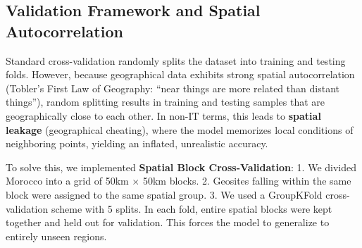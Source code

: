 \documentclass[11pt,twocolumn,a4paper]{article}
\begin{document}
\subsection{Validation Framework and Spatial Autocorrelation}
Standard cross-validation randomly splits the dataset into training and testing folds. However, because geographical data exhibits strong spatial autocorrelation (Tobler's First Law of Geography: ``near things are more related than distant things''), random splitting results in training and testing samples that are geographically close to each other. In non-IT terms, this leads to \textbf{spatial leakage} (geographical cheating), where the model memorizes local conditions of neighboring points, yielding an inflated, unrealistic accuracy.

To solve this, we implemented \textbf{Spatial Block Cross-Validation}:
1. We divided Morocco into a grid of 50km $\times$ 50km blocks.
2. Geosites falling within the same block were assigned to the same spatial group.
3. We used a GroupKFold cross-validation scheme with 5 splits. In each fold, entire spatial blocks were kept together and held out for validation. This forces the model to generalize to entirely unseen regions.
\end{document}
